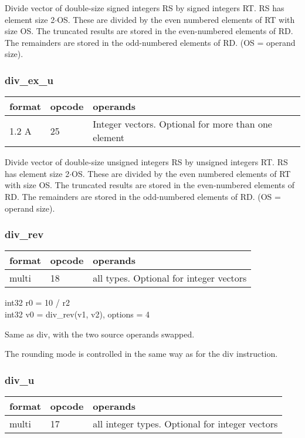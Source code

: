 \documentclass[forwardcom.tex]{subfiles}
\begin{document}
Divide vector of double-size signed integers RS by signed integers RT. RS has element size 2$\cdot$OS. These are divided by the even numbered
elements of RT with size OS. The truncated results are stored in the even-numbered elements of RD. The remainders are stored in the odd-numbered elements of RD.
(OS = operand size).

\subsubsection{div\_ex\_u}
\label{table:divExUInstruction}
\begin{tabular}{|p{12mm}|p{12mm}|p{110mm}|}
\hline
\bfseries format & \bfseries opcode & \bfseries operands \\ \hline
1.2 A & 25 & Integer vectors. Optional for more than one element \\ \hline
\end{tabular}
\vspace{2mm}

Divide vector of double-size unsigned integers RS by unsigned integers RT. RS has element size 2$\cdot$OS. These are divided by the even numbered elements of RT with size OS. The truncated results are stored in the even-numbered elements of RD. The remainders are stored in the odd-numbered elements of RD.
(OS = operand size).

\subsubsection{div\_rev}
\label{table:divRevInstruction}
\begin{tabular}{|p{12mm}|p{12mm}|p{110mm}|}
\hline
\bfseries format & \bfseries opcode & \bfseries operands \\ \hline
multi & 18 & all types. Optional for integer vectors \\ \hline
\end{tabular}
\vspace{2mm}

int32 r0 = 10 / r2 \\
int32 v0 = div\_rev(v1, v2), options = 4
\vspace{2mm}

Same as div, with the two source operands swapped.

The rounding mode is controlled in the same way as for the div instruction.

\subsubsection{div\_u}
\label{table:divUInstruction}
\begin{tabular}{|p{12mm}|p{12mm}|p{110mm}|}
\hline
\bfseries format & \bfseries opcode & \bfseries operands \\ \hline
multi & 17 & all integer types. Optional for integer vectors \\ \hline
\end{tabular}
\vspace{2mm}
\end{document}
